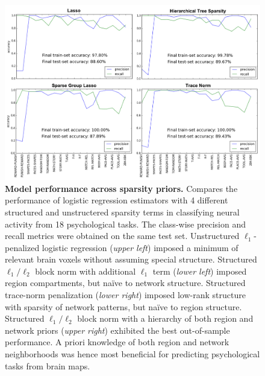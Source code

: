 \documentclass{article} %
\begin{document}
\begin{figure}
\begin{centering}
\includegraphics[width=1.00\textwidth]{figures/sparsities.pdf}
\end{centering}
\vspace{-0.6cm}
\caption{\textbf{Model performance across sparsity priors.}
Compares the performance of logistic regression estimators
with 4 different structured and unstructered sparsity terms
in classifying neural activity from 18 psychological tasks.
The class-wise precision and recall metrics
were obtained on the same test set.
%
Unstructured $\ell_1$-penalized logistic regression (\textit{upper left})
imposed a minimum of relevant brain voxels without
assuming special structure.
Structured $\ell_1/\ell_2$ block norm with additional $\ell_1$ term
(\textit{lower left})
imposed region compartments, but na\"ive to network structure.
Structured trace-norm penalization (\textit{lower right})
imposed low-rank structure
with sparsity of network patterns, but na\"ive to region structure.
Structured $\ell_1/\ell_2$ block norm with a hierarchy of
both region and network priors (\textit{upper right})
exhibited the best out-of-sample performance.
%
A priori knowledge of both region and network neighborhoods
was hence most beneficial for predicting psychological tasks from
brain maps.
}
\label{fig_sparsities}
\end{figure}
\end{document}
